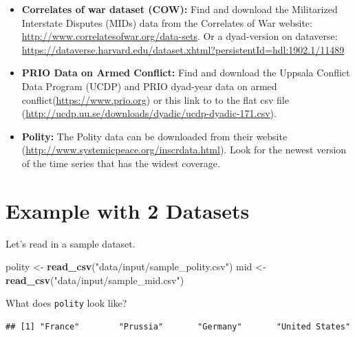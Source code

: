 \documentclass[]{book}
\newenvironment{Shaded}{\begin{snugshade}}{\end{snugshade}}
\newcommand{\KeywordTok}[1]{\textcolor[rgb]{0.13,0.29,0.53}{\textbf{#1}}}
\newcommand{\NormalTok}[1]{#1}
\newcommand{\OperatorTok}[1]{\textcolor[rgb]{0.81,0.36,0.00}{\textbf{#1}}}
\newcommand{\StringTok}[1]{\textcolor[rgb]{0.31,0.60,0.02}{#1}}
\providecommand{\tightlist}{%
  \setlength{\itemsep}{0pt}\setlength{\parskip}{0pt}}
\theoremstyle{definition}
\theoremstyle{definition}
\theoremstyle{definition}
\theoremstyle{remark}
\begin{document}
\begin{itemize}
\tightlist
\item
  \textbf{Correlates of war dataset (COW):} Find and download the Militarized Interstate Disputes (MIDs) data from the Correlates of War website: \url{http://www.correlatesofwar.org/data-sets}. Or a dyad-version on dataverse: \url{https://dataverse.harvard.edu/dataset.xhtml?persistentId=hdl:1902.1/11489}
\item
  \textbf{PRIO Data on Armed Conflict:} Find and download the Uppsala Conflict Data Program (UCDP) and PRIO dyad-year data on armed conflict(\url{https://www.prio.org}) or this link to to the flat csv file (\url{http://ucdp.uu.se/downloads/dyadic/ucdp-dyadic-171.csv}).
\item
  \textbf{Polity:} The Polity data can be downloaded from their website (\url{http://www.systemicpeace.org/inscrdata.html}). Look for the newest version of the time series that has the widest coverage.
\end{itemize}

\hypertarget{example-with-2-datasets}{%
\section{Example with 2 Datasets}\label{example-with-2-datasets}}

Let's read in a sample dataset.

\begin{Shaded}
\begin{Highlighting}[]
\NormalTok{polity <-}\StringTok{ }\KeywordTok{read_csv}\NormalTok{(}\StringTok{"data/input/sample_polity.csv"}\NormalTok{)}
\NormalTok{mid <-}\StringTok{ }\KeywordTok{read_csv}\NormalTok{(}\StringTok{"data/input/sample_mid.csv"}\NormalTok{)}
\end{Highlighting}
\end{Shaded}

What does \texttt{polity} look like?

\begin{Shaded}
\end{Shaded}

\begin{verbatim}
## [1] "France"        "Prussia"       "Germany"       "United States"
\end{verbatim}
\end{document}
